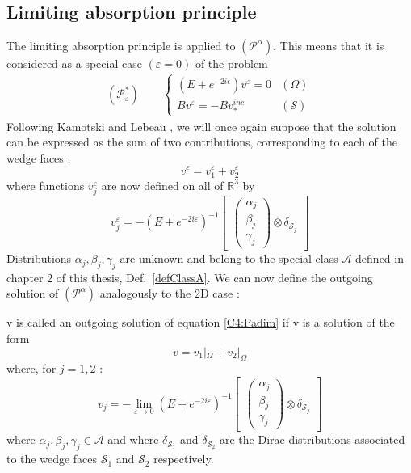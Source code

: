 \subsection{Limiting absorption principle}
The limiting absorption principle is applied to $(\mathcal{P}^{\alpha})$. This means that it is considered as a special case $(\varepsilon=0)$ of the problem
\begin{eqnarray}
(\mathcal{P}^*_{\varepsilon}) \hspace{2em} \left\{
\begin{array}{lr}
(E+e^{-2i\epsilon})v^{\varepsilon}=0 & (\Omega) \\
Bv^{\varepsilon}=-Bv_*^{inc} & (\mathcal{S})
\end{array}
\right.
\label{C4:Pabs}
\end{eqnarray}
Following Kamotski and Lebeau \cite{KamotskiLebeau}, we will once again suppose that the solution can be expressed as the sum of two contributions, corresponding to each of the wedge faces :
\begin{equation}
v^{\varepsilon}=v_1^{\varepsilon}+v_2^{\varepsilon}
\label{C4:v1+v2}
\end{equation}
where functions $v_j^{\varepsilon}$ are now defined on all of  $\mathbb{R}^3$ by
\begin{equation}
v_j^{\varepsilon}=-(E+e^{-2i\varepsilon})^{-1} \begin{bmatrix}
\begin{pmatrix}
\alpha_j \\
\beta_j \\
\gamma_j
\end{pmatrix}
\otimes \delta_{\mathcal{S}_j}
\end{bmatrix}
\label{C4:vjdef}
\end{equation}
Distributions $\alpha_j,\beta_j, \gamma_j $ are unknown and belong to the special class $\mathcal{A}$ defined in chapter 2 of this thesis, Def.~\ref{defClassA}. We can now define the outgoing solution of $(\mathcal{P}^{\alpha})$ analogously to the 2D case :
\begin{definition}
	 v is called an outgoing solution of equation \eqref{C4:Padim} if v is a solution of the form
	\begin{equation}
	\label{C4:decomposition}
	v=v_1|_{\Omega}+v_2|_{\Omega}
	\end{equation}
	where, for $j=1,2$ :
	\begin{equation}
	\label{C4:inv_potentiels}
	v_j=-\lim_{\varepsilon \to 0} (E+e^{-2i\varepsilon})^{-1} \begin{bmatrix}
\begin{pmatrix}
\alpha_j \\
\beta_j \\
\gamma_j
\end{pmatrix}
\otimes \delta_{\mathcal{S}_j}
\end{bmatrix}
	\end{equation}
	where $\alpha_j,\beta_j,\gamma_j \in \mathcal{A}$ and where $\delta_{\mathcal{S}_1}$ and $\delta_{\mathcal{S}_2}$ are the Dirac distributions associated to the wedge faces $\mathcal{S}_1$ and $\mathcal{S}_2$ respectively.
\end{definition}
